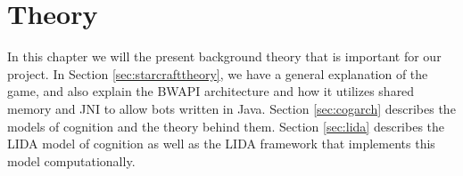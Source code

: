 
\chapter{Theory}
In this chapter we will the present background theory that is important for our project. In Section \ref{sec:starcrafttheory}, we have a general explanation of the game, and also explain the BWAPI architecture and how it utilizes shared memory and JNI to allow bots written in Java. Section \ref{sec:cogarch} describes the models of cognition and the theory behind them. Section \ref{sec:lida} describes the LIDA model of cognition as well as the LIDA framework that implements this model computationally.


